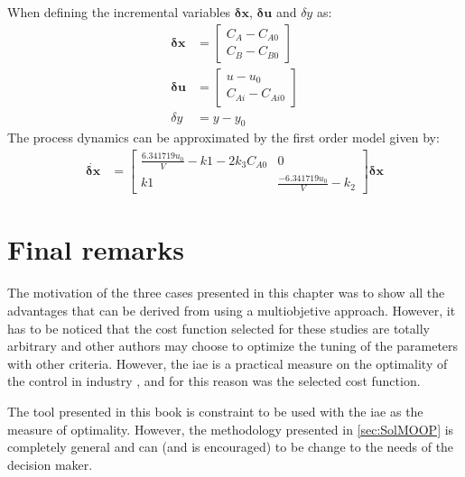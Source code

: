 When defining the incremental variables $\mathbf{\delta x}$, $\mathbf{\delta u}$ and $\delta y$ as:
\begin{align*}
\mathbf{\delta x} &= \left[ \begin{array}{c} C_A - C_{A0} \\ C_B - C_{B0} \end{array} \right] \\
\mathbf{\delta u} &= \left[ \begin{array}{c} u-u_0 \\ C_{Ai} - C_{Ai0} \end{array} \right] \\
\delta y &= y - y_0
\end{align*}
The process dynamics can be approximated by the first order model given by:
%
\begin{align}
\dot{\mathbf{\delta x}} &= \left[ \begin{array}{cc} \frac{6.341719 u_0}{V} - k1 - 2 k_3 C_{A0} & 0 \\ k1 & \frac{-6.341719 u_0}{V} - k_2 \end{array}\right] \mathbf{\delta x}%
%
\end{align}
\cite{Kuntanapreeda2012}
 
\section{Final remarks}
\label{sec:FinalRemarks}
The motivation of the three cases presented in this chapter was to show all the advantages that can be derived from using a multiobjetive approach. However, it has to be noticed that the cost function selected for these studies are totally  arbitrary and other authors may choose to optimize the tuning of the parameters with other criteria. However, the \gls{iae} is a practical measure on the optimality of the control in industry \citep{Shinskey2002}, and for this reason was the selected cost function.

The tool presented in this book is constraint to be used with the \gls{iae} as the measure of optimality. However, the methodology presented in \ref{sec:SolMOOP} is completely general and can (and is encouraged) to be change to the needs of the decision maker.




